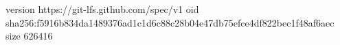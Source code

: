version https://git-lfs.github.com/spec/v1
oid sha256:f5916b834da1489376ad1c1d6c88c28b04e47db75efce4df822bec1f48af6aec
size 626416
